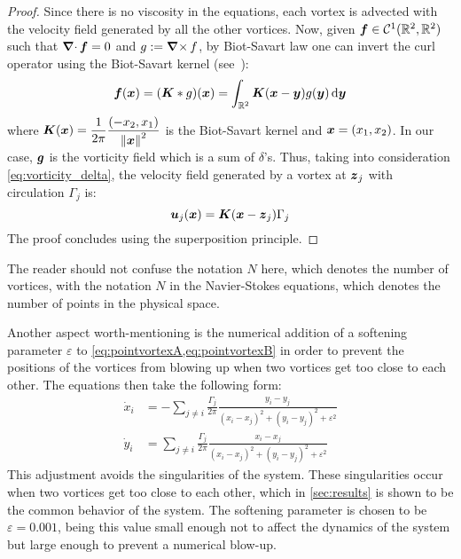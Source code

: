 \documentclass[../main.tex]{subfiles}
\begin{document}
\begin{proof}
	Since there is no viscosity in the equations, each vortex is advected with the velocity field generated by all the other vortices. Now, given $\boldsymbol{f}\in \mathcal{C}^1(\mathbb{R}^2,\mathbb{R}^2)$ such that $\operatorname{\boldsymbol{\nabla}\cdot} \boldsymbol{f} = 0$ and $g:=\operatorname{\boldsymbol{\nabla}\times} f$, by Biot-Savart law one can invert the curl operator using the Biot-Savart kernel (see~\cite{Griffiths}):
	\begin{equation}\label{eq:biotsavart}
		\boldsymbol{f}(\boldsymbol{x}) = (\boldsymbol{K} * g)(\boldsymbol{x}) = \int_{\mathbb{R}^2} \boldsymbol{K}(\boldsymbol{x}-\boldsymbol{y}) g(\boldsymbol{y}) \dd{\boldsymbol{y}}
	\end{equation}
	where $\displaystyle\boldsymbol{K}(\boldsymbol{x}) = \frac{1}{2\pi} \frac{(-x_2,x_1)}{{\left\|\boldsymbol{x}\right\|^2}}$ is the Biot-Savart kernel and $\boldsymbol{x}=(x_1,x_2)$. In our case, $\boldsymbol{g}$ is the vorticity field which is a sum of $\delta$'s. Thus, taking into consideration \cref{eq:vorticity_delta}, the velocity field generated by a vortex at $\boldsymbol{z}_j$ with circulation $\Gamma_j$ is:
	\begin{equation}
		\boldsymbol{u}_j(\boldsymbol{x}) = \boldsymbol{K}(\boldsymbol{x}-\boldsymbol{z}_j) \Gamma_j
	\end{equation}
	The proof concludes using the superposition principle.
\end{proof}
The reader should not confuse the notation $N$ here, which denotes the number of vortices, with the notation $N$ in the Navier-Stokes equations, which denotes the number of points in the physical space.

Another aspect worth-mentioning is the numerical addition of a softening parameter $\varepsilon$ to \cref{eq:pointvortexA,eq:pointvortexB} in order to prevent the positions of the vortices from blowing up when two vortices get too close to each other. The equations then take the following form:
\begin{align}\label{eq:pointvortexA_soft}
	\dot{x}_i & = -\sum_{j\neq i} \frac{\Gamma_j}{2\pi} \frac{y_i-y_j}{{(x_i-x_j)}^2+{(y_i-y_j)}^2+\varepsilon^2} \\
	\label{eq:pointvortexB_soft}
	\dot{y}_i & = \sum_{j\neq i} \frac{\Gamma_j}{2\pi} \frac{x_i-x_j}{{(x_i-x_j)}^2+{(y_i-y_j)}^2+\varepsilon^2}
\end{align}
This adjustment avoids the singularities of the system. These singularities occur when two vortices get too close to each other, which in \cref{sec:results} is shown to be the common behavior of the system. The softening parameter is chosen to be $\varepsilon=0.001$, being this value small enough not to affect the dynamics of the system but large enough to prevent a numerical blow-up.
\end{document}
